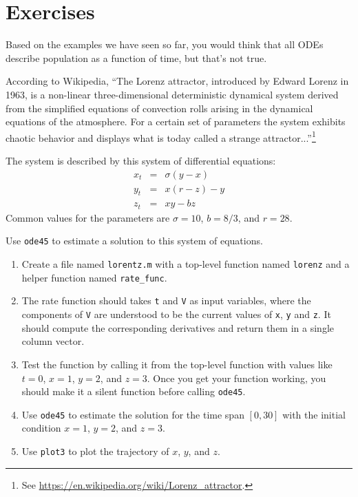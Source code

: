 \documentclass[
]{book}
\numberwithin{Answer}{chapter}
\numberwithin{Exercise}{chapter}
\begin{document}
\section{Exercises}

\begin{ex}

Based on the examples we have seen so far, you would think that
all ODEs describe population as
a function of time, but that's not true.

According to Wikipedia,
``The Lorenz attractor, introduced by Edward Lorenz in 1963, is a
non-linear three-dimensional deterministic dynamical system derived
from the simplified equations of convection rolls arising in the
dynamical equations of the atmosphere. For a certain set of parameters
the system exhibits chaotic behavior and displays what is today called
a strange attractor...''\footnote{See \url{https://en.wikipedia.org/wiki/Lorenz_attractor}.}

The system is described by this system of differential equations:
%
\begin{eqnarray}
x_t &=& \sigma (y - x)  \\
y_t &=& x (r - z) - y   \\
z_t &=& xy - b z
\end{eqnarray}
%
Common values for the parameters are $\sigma = 10$, $b = 8/3$, and $r=28$.

Use {\tt ode45} to estimate a solution to this
system of equations.


\begin{enumerate}

\item Create a file named {\tt lorentz.m} with a top-level function named {\tt lorenz} and a helper function named \verb"rate_func".

\item  The rate function should
takes {\tt t} and {\tt V} as input variables, where the components
of {\tt V} are understood to be the current values of {\tt x},
{\tt y} and {\tt z}.  It should compute the corresponding derivatives
and return them in a single column vector.

\item Test the function by calling it from the top-level function with values like $t=0$, $x=1$, $y=2$, and $z=3$.  Once you get your function working, you should make it a silent function before calling {\tt ode45}.

\item Use {\tt ode45}
to estimate the solution for the time span $[0, 30]$
with the initial condition $x=1$, $y=2$, and $z=3$.

\item Use {\tt plot3} to plot the trajectory of
$x$, $y$, and $z$.

\end{enumerate}

\end{ex}
\end{document}
